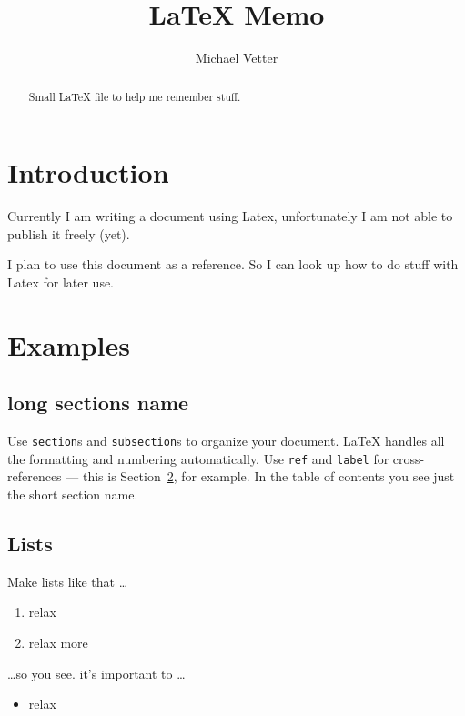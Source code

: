 \documentclass[12pt]{article}
\title{\LaTeX{} Memo}
\author{Michael Vetter}
\begin{document}
\maketitle

\begin{abstract}
Small \LaTeX{} file to help me remember stuff.
\end{abstract}


\tableofcontents

\section{Introduction}

Currently I am writing a document using Latex, unfortunately I am not able to publish it freely (yet).

I plan to use this document as a reference. So I can look up how to do stuff with Latex for later use.

\section{Examples}
\label{sec:examples}

\subsection[Sections]{long sections name}

Use \texttt{section}s and \texttt{subsection}s to organize your document. \LaTeX{} handles all the formatting and numbering automatically. Use \texttt{ref} and \texttt{label} for cross-references --- this is Section~\ref{sec:examples}, for example.
In the table of contents you see just the short section name.



\subsection{Lists}

Make lists like that \dots

\begin{enumerate}
\item relax
\item relax more
\end{enumerate}
\dots so you see. it's important to \dots
\begin{itemize}
\item relax
\end{itemize}
\end{document}
